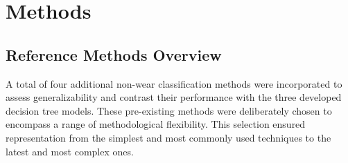 \documentclass[
  10pt,
]{scrbook}
\begin{document}
\hypertarget{methods-1}{%
\section{Methods}\label{methods-1}}

\hypertarget{reference-methods-overview}{%
\subsection{Reference Methods
Overview}\label{reference-methods-overview}}

A total of four additional non-wear classification methods were
incorporated to assess generalizability and contrast their performance
with the three developed decision tree models. These pre-existing
methods were deliberately chosen to encompass a range of methodological
flexibility. This selection ensured representation from the simplest and
most commonly used techniques to the latest and most complex ones.
\end{document}
